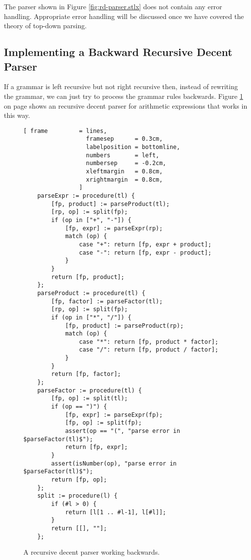 The parser shown in Figure \ref{fig:rd-parser.stlx} does not contain any error handling. 
Appropriate error handling will be discussed once we have covered the theory of top-down parsing.


\subsection{Implementing a  Backward Recursive Decent Parser}
If a grammar is left recursive but not right recursive then, instead of rewriting the
grammar, we can just try to process the grammar rules backwards.
Figure \ref{fig:rd-backward-parser.stlx} on page \pageref{fig:rd-backward-parser.stlx}
shows an recursive decent parser for arithmetic expressions that works in this way.

\begin{figure}[!ht]
\centering
\begin{Verbatim}[ frame         = lines, 
                  framesep      = 0.3cm, 
                  labelposition = bottomline,
                  numbers       = left,
                  numbersep     = -0.2cm,
                  xleftmargin   = 0.8cm,
                  xrightmargin  = 0.8cm,
                ]
    parseExpr := procedure(tl) {
        [fp, product] := parseProduct(tl);
        [rp, op] := split(fp);
        if (op in ["+", "-"]) {
            [fp, expr] := parseExpr(rp);
            match (op) {
                case "+": return [fp, expr + product];
                case "-": return [fp, expr - product];
            }
        }
        return [fp, product];
    };    
    parseProduct := procedure(tl) {
        [fp, factor] := parseFactor(tl);
        [rp, op] := split(fp);
        if (op in ["*", "/"]) {
            [fp, product] := parseProduct(rp);
            match (op) {
                case "*": return [fp, product * factor];
                case "/": return [fp, product / factor];
            }
        }
        return [fp, factor];
    };
    parseFactor := procedure(tl) {
        [fp, op] := split(tl);
        if (op == ")") {
            [fp, expr] := parseExpr(fp);
            [fp, op] := split(fp);
            assert(op == "(", "parse error in $parseFactor(tl)$");
            return [fp, expr];
        }
        assert(isNumber(op), "parse error in $parseFactor(tl)$");
        return [fp, op];
    };    
    split := procedure(l) {
        if (#l > 0) {
            return [l[1 .. #l-1], l[#l]];
        } 
        return [[], ""];
    };
\end{Verbatim}
\vspace*{-0.3cm}
\caption{A recursive decent parser working backwards.}
\label{fig:rd-backward-parser.stlx}
\end{figure}


